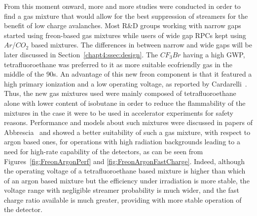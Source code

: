 	From this moment onward, more and more studies were conducted in order to find a gas mixture that would allow for the best suppression of streamers for the benefit of low charge avalanches. Most R\&D groups working with narrow gaps started using freon-based gas mixtures while users of wide gap RPCs kept using $Ar$/$CO_2$ based mixtures. The differences in between narrow and wide gaps will be later discussed in Section~\ref{chapt4:ssec:design}. The $CF_3Br$ having a high GWP, tetrafluoroethane was preferred to it as more suitable ecofriendly gas in the middle of the 90s. An advantage of this new freon component is that it featured a high primary ionization and a low operating voltage, as reported by Cardarelli~\cite{CARDARELLI96}. Thus, the new gas mixtures used were mainly composed of tetrafluoroethane alone with lower content of isobutane in order to reduce the flammability of the mixtures in the case it were to be used in accelerator experiments for safety reasons. Performance and models about such mixtures were discussed in papers of Abbrescia~\cite{ABBRESCIA1997PERF,ABBRESCIA1997} and showed a better suitability of such a gas mixture, with respect to argon based ones, for operations with high radiation backgrounds leading to a need for high-rate capability of the detectors, as can be seen from Figures~\ref{fig:FreonArgonPerf} and \ref{fig:FreonArgonFastCharge}. Indeed, although the operating voltage of a tetrafluoroethane based mixture is higher than which of an argon based mixture but the efficiency under irradiation is more stable, the voltage range with negligible streamer probability is much wider, and the fast charge ratio available is much greater, providing with more stable operation of the detector.
	
